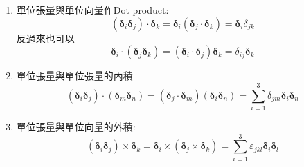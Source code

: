 \documentclass[../main.tex]{subfiles}
\begin{document}
\begin{itemize}
\begin{itemize}
\begin{enumerate}
\begin{equation}
            \left(\bm \delta_j \cdot \bm \delta_k\right) \left(
              \bm \delta_i \cdot \bm \delta_n
            \right) = \delta_{jm}\delta_{in}
          \end{equation}
          另外，也可以很上述很簡單的規則得到:
          \begin{align}
             \bm \delta_i \bm \delta_j : \bm \delta_m \bm \delta_n &=
              \bm \delta_i \left(
                \bm \delta_j : \bm \delta_m \bm \delta_n
              \right) \nonumber \\
              &= \bm \delta_i \left(
                \left(\bm \delta_j \cdot \bm \delta_m\right) \bm \delta_n
              \right) \nonumber \\
              &= \left(\bm \delta_j \cdot \bm \delta_m\right) \left(\bm \delta_i \cdot \bm \delta_n\right) \nonumber \\
              &= \delta_{jm}\delta_{in}
          \end{align}
        \item 單位張量與單位向量作Dot product:
          \begin{equation}
            \boxed{
              \left(\bm\delta_i\bm\delta_j\right) \cdot \bm \delta_k =
              \bm \delta_i \left(\bm\delta_j \cdot \bm \delta_k\right) = \bm \delta_i\delta_{jk}}
          \end{equation}
          反過來也可以
          \begin{equation}
            \boxed{
              \bm \delta_i \cdot \left(\bm\delta_j\bm\delta_k\right) =
              \left(\bm \delta_i \cdot \bm\delta_j\right) \bm \delta_k = \delta_{ij}\bm \delta_k}
          \end{equation}
        \item 單位張量與單位張量的內積
        \begin{equation}
          \boxed{
            \left(\bm\delta_i\bm\delta_j\right) \cdot \left(\bm\delta_m\bm\delta_n\right) =
            \left(\bm\delta_j \cdot \bm\delta_m\right) \left(\bm\delta_i \bm\delta_n\right) 
            =\sum_{i=1}^3 \delta_{jm}\bm \delta_i \bm \delta_n
          }
        \end{equation}
        \item 單位張量與單位向量的外積:
        \begin{equation}
          \boxed{
            \left(\bm\delta_i\bm\delta_j\right) \times \bm \delta_k =
            \bm \delta_i \times \left(\bm\delta_j \times \bm \delta_k\right) = 
            \sum_{i=1}^3\varepsilon_{jkl}\bm \delta_i \bm \delta_l
}
\end{equation}
\end{enumerate}
\end{itemize}
\end{itemize}
\end{document}
